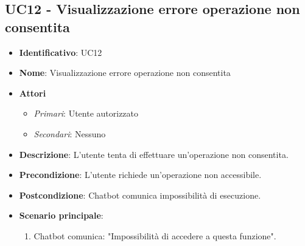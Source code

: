 \subsection{UC12 - Visualizzazione errore operazione non consentita}
\begin{itemize}
	\item \textbf{Identificativo}: UC12
	\item \textbf{Nome}:  Visualizzazione errore operazione non consentita
	\item \textbf{Attori}
	\begin{itemize} 
		\item \textit{Primari}: Utente autorizzato
		\item \textit{Secondari}: Nessuno
	\end{itemize}
	\item \textbf{Descrizione}: L'utente tenta di effettuare un'operazione non consentita.
	\item \textbf{Precondizione}:  L'utente richiede un'operazione non accessibile.
	\item \textbf{Postcondizione}: Chatbot comunica impossibilità di esecuzione.
	\item \textbf{Scenario principale}: \begin{enumerate}
		\item Chatbot comunica: "Impossibilità di accedere a questa funzione".
	\end{enumerate}
\end{itemize}